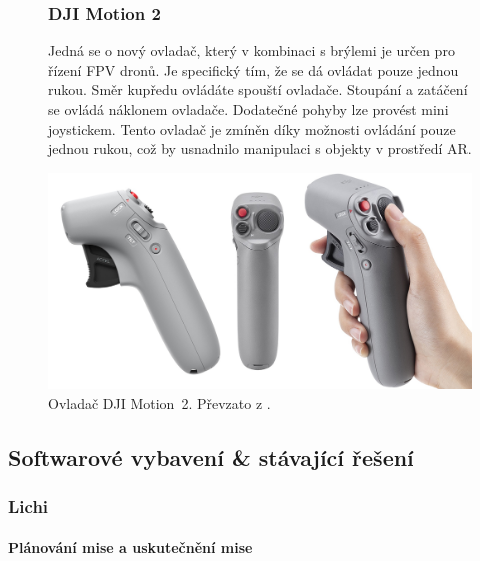 \begin{figure}[h]
  \begin{minipage}{0.6\textwidth}
  \subsubsection{DJI Motion 2 }
    Jedná se o nový ovladač, který v kombinaci s brýlemi je určen pro řízení FPV dronů. Je specifický tím, že se dá ovládat pouze jednou rukou. Směr kupředu ovládáte spouští ovladače. Stoupání a zatáčení se ovládá náklonem ovladače. Dodatečné pohyby lze provést mini joystickem. Tento ovladač je zmíněn díky možnosti ovládání pouze jednou rukou, což by usnadnilo manipulaci s objekty v prostředí AR. 
  \end{minipage}%
  \hfill
  \begin{minipage}{0.38\textwidth}
    \centering
    \includegraphics[width=\textwidth]{obrazky-figures/drony/djiMotion.png}
    \captionsetup{type=figure} %
    \caption{Ovladač DJI Motion~2. Převzato z \cite{djiMotionPic}.}
    \label{fig:DjiMotion}
  \end{minipage}
\end{figure}
\newpage
\subsection{Softwarové vybavení \& stávající řešení}

\subsubsection{Lichi}

\paragraph{Plánování mise a uskutečnění mise}

